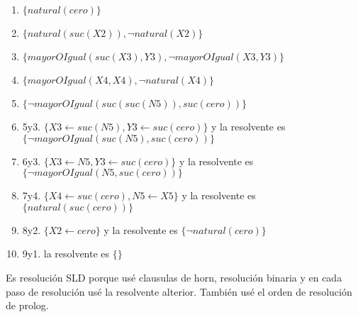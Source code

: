 \documentclass[10pt,a4paper]{article}
\begin{document}
	\begin{enumerate}
	\item $\{natural(cero) \}$
	\item $\{natural(suc(X2)), \neg natural(X2) \}$
	\item $\{mayorOIgual(suc(X3),Y3), \neg mayorOIgual(X3,Y3) \}$
	\item $\{mayorOIgual(X4,X4), \neg natural(X4) \}$
	\item $\{\neg mayorOIgual(suc(suc(N5)),suc(cero))\}$
	\item 5y3. $\{X3 \leftarrow suc(N5), Y3 \leftarrow suc(cero)\}$ y la resolvente es $\{\neg mayorOIgual(suc(N5),suc(cero))\}$
	\item 6y3. $\{X3 \leftarrow N5, Y3 \leftarrow suc(cero)\}$ y la resolvente es $\{\neg mayorOIgual(N5,suc(cero))\}$
	\item 7y4. $\{X4 \leftarrow suc(cero),N5 \leftarrow X5\}$ y la resolvente es $\{natural(suc(cero))\}$
	\item 8y2. $\{X2 \leftarrow cero\}$ y la resolvente es $\{\neg natural(cero)\}$
	\item 9y1. la resolvente es $\{\}$
	\end{enumerate}
	Es resolución SLD porque usé clausulas de horn, resolución binaria y en cada paso de resolución usé la resolvente alterior. También usé el orden de resolución de prolog.
\end{document}
